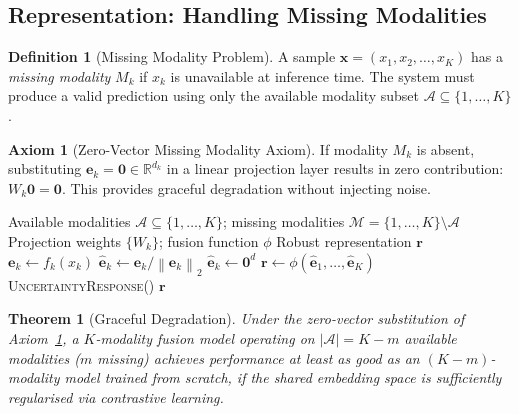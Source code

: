 \documentclass[12pt,a4paper]{article}
\theoremstyle{definition}
\newtheorem{definition}{Definition}[section]
\newtheorem{axiom}{Axiom}[section]
\theoremstyle{plain}
\newtheorem{theorem}{Theorem}[section]
\theoremstyle{remark}
\newcommand{\R}{\mathbb{R}}
\newcommand{\Norm}[1]{\left\|#1\right\|_2}
\begin{document}
\subsection{Representation: Handling Missing Modalities}

\begin{definition}[Missing Modality Problem]
A sample $\mathbf{x} = (x_1, x_2, \ldots, x_K)$ has a \emph{missing modality} $M_k$ if $x_k$ is unavailable at inference time. The system must produce a valid prediction using only the available modality subset $\mathcal{A} \subseteq \{1,\ldots,K\}$.
\end{definition}

\begin{axiom}[Zero-Vector Missing Modality Axiom]
\label{ax:missing}
If modality $M_k$ is absent, substituting $\mathbf{e}_k = \bm{0} \in \R^{d_k}$ in a linear projection layer results in zero contribution: $W_k \bm{0} = \bm{0}$. This provides graceful degradation without injecting noise.
\end{axiom}

\begin{algorithm}[H]
\caption{Missing-Modality Robust Inference}
\label{alg:missing_modal}
\begin{algorithmic}[1]
\Require Available modalities $\mathcal{A} \subseteq \{1,\ldots,K\}$; missing modalities $\mathcal{M} = \{1,\ldots,K\}\setminus\mathcal{A}$
\Require Projection weights $\{W_k\}$; fusion function $\phi$
\Ensure Robust representation $\mathbf{r}$
    \State $\mathbf{e}_k \gets f_k(x_k)$ 
    \State $\hat{\mathbf{e}}_k \gets \mathbf{e}_k / \Norm{\mathbf{e}_k}$ 
  \Else
    \State $\hat{\mathbf{e}}_k \gets \bm{0}^d$ 
  \EndIf
\EndFor
\State $\mathbf{r} \gets \phi(\hat{\mathbf{e}}_1, \ldots, \hat{\mathbf{e}}_K)$ 
  \State \Return \textsc{UncertaintyResponse}() 
\EndIf
\State \Return $\mathbf{r}$
\end{algorithmic}
\end{algorithm}

\begin{theorem}[Graceful Degradation]
Under the zero-vector substitution of Axiom~\ref{ax:missing}, a $K$-modality fusion model operating on $|\mathcal{A}| = K - m$ available modalities ($m$ missing) achieves performance at least as good as an $(K-m)$-modality model trained from scratch, if the shared embedding space is sufficiently regularised via contrastive learning.
\end{theorem}
\end{document}
